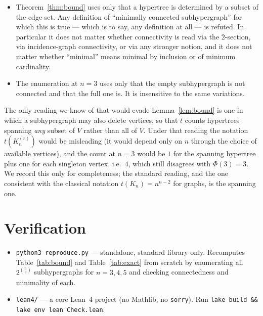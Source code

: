 \documentclass[11pt]{article}
\theoremstyle{remark}
\begin{document}
\begin{itemize}
\item Theorem~\ref{thm:bound} uses only that a hypertree is determined by a
subset of the edge set. Any definition of ``minimally connected
subhypergraph'' for which this is true --- which is to say, any definition at
all --- is refuted. In particular it does not matter whether connectivity is
read via the $2$-section, via incidence-graph connectivity, or via any stronger
notion, and it does not matter whether ``minimal'' means minimal by inclusion or
of minimum cardinality.
\item The enumeration at $n = 3$ uses only that the empty subhypergraph is not
connected and that the full one is. It is insensitive to the same variations.
\end{itemize}

The only reading we know of that would evade Lemma~\ref{lem:bound} is one in
which a subhypergraph may also delete vertices, so that $t$ counts hypertrees
spanning \emph{any} subset of $V$ rather than all of $V$. Under that reading the
notation $t(K_n^{(r)})$ would be misleading (it would depend only on $n$ through
the choice of available vertices), and the count at $n = 3$ would be $1$ for the
spanning hypertree plus one for each singleton vertex, i.e.\ $4$, which still
disagrees with $\Phi(3) = 3$. We record this only for completeness; the
standard reading, and the one consistent with the classical notation
$t(K_n) = n^{n-2}$ for graphs, is the spanning one.

\section{Verification}

\begin{itemize}
\item \texttt{python3 reproduce.py} --- standalone, standard library only.
Recomputes Table~\ref{tab:bound} and Table~\ref{tab:exact} from scratch by
enumerating all $2^{\binom{n}{3}}$ subhypergraphs for $n = 3,4,5$ and checking
connectedness and minimality of each.
\item \texttt{lean4/} --- a core Lean~4 project (no Mathlib, no \texttt{sorry}).
Run \texttt{lake build \&\& lake env lean Check.lean}.
\end{itemize}
\end{document}
